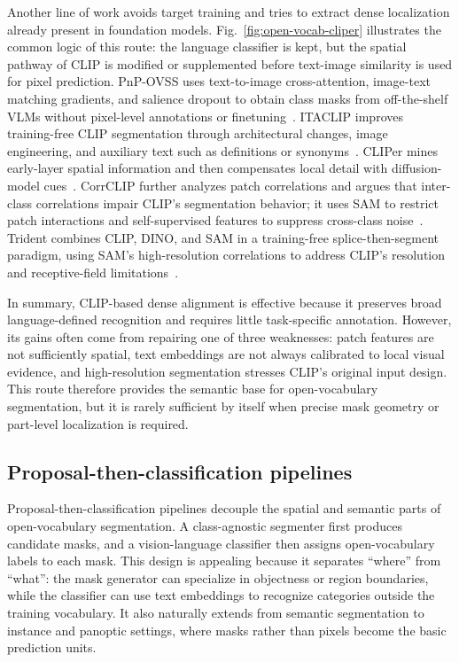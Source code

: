Another line of work avoids target training and tries to extract dense localization already present in foundation models. Fig.~\ref{fig:open-vocab-cliper} illustrates the common logic of this route: the language classifier is kept, but the spatial pathway of CLIP is modified or supplemented before text-image similarity is used for pixel prediction. PnP-OVSS uses text-to-image cross-attention, image-text matching gradients, and salience dropout to obtain class masks from off-the-shelf VLMs without pixel-level annotations or finetuning~\citep{luo2024pnpovss}. ITACLIP improves training-free CLIP segmentation through architectural changes, image engineering, and auxiliary text such as definitions or synonyms~\citep{maaydinItaclipBoostingTrainingfree2025}. CLIPer mines early-layer spatial information and then compensates local detail with diffusion-model cues~\citep{lsunCliperHierarchicallyImproving2025}. CorrCLIP further analyzes patch correlations and argues that inter-class correlations impair CLIP's segmentation behavior; it uses SAM to restrict patch interactions and self-supervised features to suppress cross-class noise~\citep{dzhangCorrclipReconstructingPatch2025}. Trident combines CLIP, DINO, and SAM in a training-free splice-then-segment paradigm, using SAM's high-resolution correlations to address CLIP's resolution and receptive-field limitations~\citep{shiyHarnessingVisionFoundation2025}.

In summary, CLIP-based dense alignment is effective because it preserves broad language-defined recognition and requires little task-specific annotation. However, its gains often come from repairing one of three weaknesses: patch features are not sufficiently spatial, text embeddings are not always calibrated to local visual evidence, and high-resolution segmentation stresses CLIP's original input design. This route therefore provides the semantic base for open-vocabulary segmentation, but it is rarely sufficient by itself when precise mask geometry or part-level localization is required.

\subsection{Proposal-then-classification pipelines}

Proposal-then-classification pipelines decouple the spatial and semantic parts of open-vocabulary segmentation. A class-agnostic segmenter first produces candidate masks, and a vision-language classifier then assigns open-vocabulary labels to each mask. This design is appealing because it separates ``where'' from ``what'': the mask generator can specialize in objectness or region boundaries, while the classifier can use text embeddings to recognize categories outside the training vocabulary. It also naturally extends from semantic segmentation to instance and panoptic settings, where masks rather than pixels become the basic prediction units.

